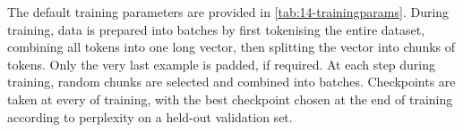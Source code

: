 

The default training parameters are provided in \cref{tab:14-trainingparams}. During training, data is prepared into batches by first tokenising the entire dataset, combining all tokens into one long vector, then splitting the vector into chunks of  tokens. Only the very last example is padded, if required. At each step during training, random chunks are selected and combined into batches. Checkpoints are taken at every  of training, with the best checkpoint chosen at the end of training according to perplexity on a held-out validation set.%


